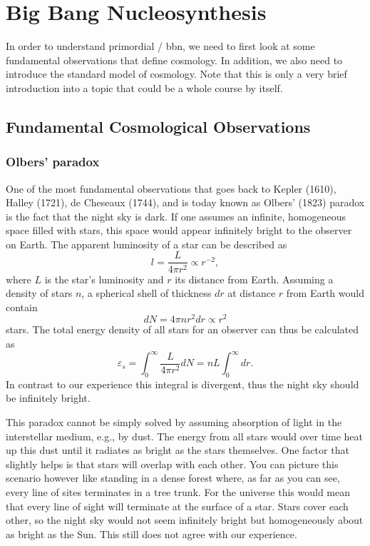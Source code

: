 
\chapter{Big Bang Nucleosynthesis}

In order to understand primordial / \acf{bbn}, we need to first look at some fundamental observations that define cosmology. In addition, we also need to introduce the standard model of cosmology. Note that this is only a very brief introduction into a topic that could be a whole course by itself.

\section{Fundamental Cosmological Observations}

\subsection{Olbers' paradox}

One of the most fundamental observations that goes back to Kepler (1610), Halley (1721), de Cheseaux (1744), and is today known as Olbers' (1823) paradox is the fact that the night sky is dark. If one assumes an infinite, homogeneous space filled with stars, this space would appear infinitely bright to the observer on Earth. The apparent luminosity of a star can be described as
\begin{equation}\label{eqn:bbn:relative_luminosity}
    l = \frac{L}{4 \pi r^{2}} \propto r^{-2},
\end{equation}
where $L$ is the star's luminosity and $r$ its distance from Earth. Assuming a density of stars $n$, a spherical shell of thickness $dr$ at distance $r$ from Earth would contain
\begin{equation}
    dN = 4 \pi n r^2 dr \propto r^2
\end{equation}
stars. The total energy density of all stars for an observer can thus be calculated as
\begin{equation}\label{eqn:bbn:total_energy_density}
    \varepsilon_s = \int_0^{\infty} \frac{L}{4\pi r^2} dN = nL \int_{0}^{\infty} dr.
\end{equation}
In contrast to our experience this integral is divergent, thus the night sky should be infinitely bright. 

This paradox cannot be simply solved by assuming absorption of light in the interstellar medium, e.g., by dust. The energy from all stars would over time heat up this dust until it radiates as bright as the stars themselves. One factor that slightly helps is that stars will overlap with each other. You can picture this scenario however like standing in a dense forest where, as far as you can see, every line of sites terminates in a tree trunk. For the universe this would mean that every line of sight will terminate at the surface of a star. Stars cover each other, so the night sky would not seem infinitely bright but homogeneously about as bright as the Sun. This still does not agree with our experience.


